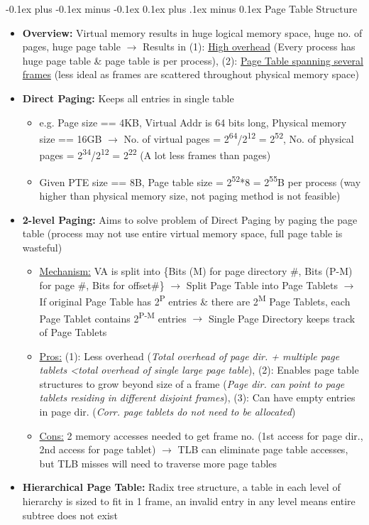 \documentclass[landscape]{article}
\makeatletter
\renewcommand{\subsection}{\@startsection{subsection}{2}{0mm}%
  {-0.1ex plus -0.1ex minus -0.1ex}%
  {0.1ex plus .1ex minus 0.1ex}%
{\normalfont\scriptsize\bfseries}}
\makeatother
\begin{document}
\begin{multicols*}{6}
    \subsection{Page Table Structure}
    \begin{itemize}
      \item \textbf{Overview:} Virtual memory results in huge logical memory space, huge no. of pages, huge page table $\rightarrow$ Results in (1): \underline{High overhead} (Every process has huge page table \& page table is per process), (2): \underline{Page Table spanning several frames} (less ideal as frames are scattered throughout physical memory space)
      \item \textbf{Direct Paging:} Keeps all entries in single table
      \begin{itemize}
        \item e.g. Page size == 4KB, Virtual Addr is 64 bits long, Physical memory size == 16GB $\rightarrow$ No. of virtual pages = 2\textsuperscript{64}/2\textsuperscript{12} = 2\textsuperscript{52}, No. of physical pages = 2\textsuperscript{34}/2\textsuperscript{12} = 2\textsuperscript{22} (A lot less frames than pages)
        \item Given PTE size == 8B, Page table size = 2\textsuperscript{52}*8 = 2\textsuperscript{55}B per process (way higher than physical memory size, not paging method is not feasible)
      \end{itemize}
      \item \textbf{2-level Paging:} Aims to solve problem of Direct Paging by paging the page table (process may not use entire virtual memory space, full page table is wasteful)
      \begin{itemize}
        \item \underline{Mechanism:} VA is split into \{Bits (M) for page directory \#, Bits (P-M) for page \#, Bits for offset\#\} $\rightarrow$ Split Page Table into Page Tablets $\rightarrow$ If original Page Table has 2\textsuperscript{P} entries \& there are 2\textsuperscript{M} Page Tablets, each Page Tablet contains 2\textsuperscript{P-M} entries $\rightarrow$ Single Page Directory keeps track of Page Tablets
        \item \underline{Pros:} (1): Less overhead (\textit{Total overhead of page dir. + multiple page tablets \textless total overhead of single large page table}), (2): Enables page table structures to grow beyond size of a frame (\textit{Page dir. can point to page tablets residing in different disjoint frames}), (3): Can have empty entries in page dir. (\textit{Corr. page tablets do not need to be allocated})
        \item \underline{Cons:} 2 memory accesses needed to get frame no. (1st access for page dir., 2nd access for page tablet) $\rightarrow$ TLB can eliminate page table accesses, but TLB misses will need to traverse more page tables
      \end{itemize}
      \item \textbf{Hierarchical Page Table:} Radix tree structure, a table in each level of hierarchy is sized to fit in 1 frame, an invalid entry in any level means entire subtree does not exist
    \end{itemize}


\end{multicols*}
\end{document}
